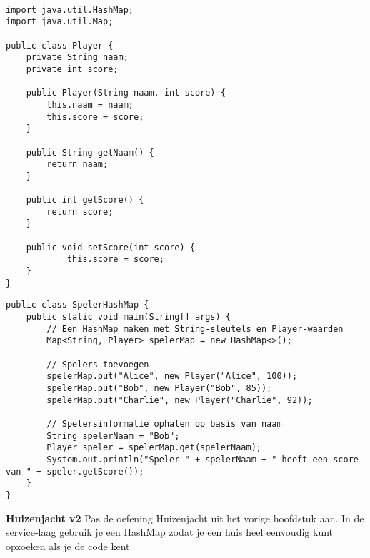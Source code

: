 \begin{lstlisting}

import java.util.HashMap;
import java.util.Map;

public class Player {
    private String naam;
    private int score;

    public Player(String naam, int score) {
        this.naam = naam;
        this.score = score;
    }

    public String getNaam() {
        return naam;
    }

    public int getScore() {
        return score;
    }
    
    public void setScore(int score) {
    		this.score = score;
    }
}
\end{lstlisting}


\begin{lstlisting}
public class SpelerHashMap {
    public static void main(String[] args) {
        // Een HashMap maken met String-sleutels en Player-waarden
        Map<String, Player> spelerMap = new HashMap<>();

        // Spelers toevoegen
        spelerMap.put("Alice", new Player("Alice", 100));
        spelerMap.put("Bob", new Player("Bob", 85));
        spelerMap.put("Charlie", new Player("Charlie", 92));

        // Spelersinformatie ophalen op basis van naam
        String spelerNaam = "Bob";
        Player speler = spelerMap.get(spelerNaam);
        System.out.println("Speler " + spelerNaam + " heeft een score van " + speler.getScore());
    }
}
\end{lstlisting}


\begin{oefening}\textbf{Huizenjacht v2}
Pas de oefening Huizenjacht uit het vorige hoofdstuk aan. In de service-laag gebruik je een HashMap zodat je een huis heel eenvoudig kunt opzoeken als je de code kent.
\end{oefening}